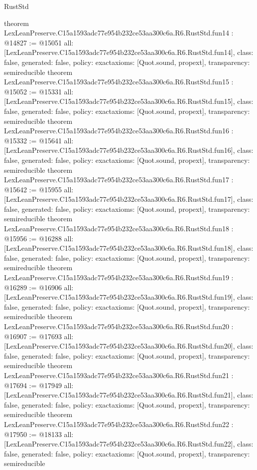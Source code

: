 \begin{lexlean}{RustStd}
\begin{coremodule}
{}
theorem LexLeanPreserve.C15a1593adc77e954b232ce53aa300c6a.R6.RustStd.fun14 : @14827 := @15051 {
  all: [LexLeanPreserve.C15a1593adc77e954b232ce53aa300c6a.R6.RustStd.fun14],
  class: false,
  generated: false,
  policy: exact{axioms: [Quot.sound, propext]},
  transparency: semireducible
}
theorem LexLeanPreserve.C15a1593adc77e954b232ce53aa300c6a.R6.RustStd.fun15 : @15052 := @15331 {
  all: [LexLeanPreserve.C15a1593adc77e954b232ce53aa300c6a.R6.RustStd.fun15],
  class: false,
  generated: false,
  policy: exact{axioms: [Quot.sound, propext]},
  transparency: semireducible
}
theorem LexLeanPreserve.C15a1593adc77e954b232ce53aa300c6a.R6.RustStd.fun16 : @15332 := @15641 {
  all: [LexLeanPreserve.C15a1593adc77e954b232ce53aa300c6a.R6.RustStd.fun16],
  class: false,
  generated: false,
  policy: exact{axioms: [Quot.sound, propext]},
  transparency: semireducible
}
theorem LexLeanPreserve.C15a1593adc77e954b232ce53aa300c6a.R6.RustStd.fun17 : @15642 := @15955 {
  all: [LexLeanPreserve.C15a1593adc77e954b232ce53aa300c6a.R6.RustStd.fun17],
  class: false,
  generated: false,
  policy: exact{axioms: [Quot.sound, propext]},
  transparency: semireducible
}
theorem LexLeanPreserve.C15a1593adc77e954b232ce53aa300c6a.R6.RustStd.fun18 : @15956 := @16288 {
  all: [LexLeanPreserve.C15a1593adc77e954b232ce53aa300c6a.R6.RustStd.fun18],
  class: false,
  generated: false,
  policy: exact{axioms: [Quot.sound, propext]},
  transparency: semireducible
}
theorem LexLeanPreserve.C15a1593adc77e954b232ce53aa300c6a.R6.RustStd.fun19 : @16289 := @16906 {
  all: [LexLeanPreserve.C15a1593adc77e954b232ce53aa300c6a.R6.RustStd.fun19],
  class: false,
  generated: false,
  policy: exact{axioms: [Quot.sound, propext]},
  transparency: semireducible
}
theorem LexLeanPreserve.C15a1593adc77e954b232ce53aa300c6a.R6.RustStd.fun20 : @16907 := @17693 {
  all: [LexLeanPreserve.C15a1593adc77e954b232ce53aa300c6a.R6.RustStd.fun20],
  class: false,
  generated: false,
  policy: exact{axioms: [Quot.sound, propext]},
  transparency: semireducible
}
theorem LexLeanPreserve.C15a1593adc77e954b232ce53aa300c6a.R6.RustStd.fun21 : @17694 := @17949 {
  all: [LexLeanPreserve.C15a1593adc77e954b232ce53aa300c6a.R6.RustStd.fun21],
  class: false,
  generated: false,
  policy: exact{axioms: [Quot.sound, propext]},
  transparency: semireducible
}
theorem LexLeanPreserve.C15a1593adc77e954b232ce53aa300c6a.R6.RustStd.fun22 : @17950 := @18133 {
  all: [LexLeanPreserve.C15a1593adc77e954b232ce53aa300c6a.R6.RustStd.fun22],
  class: false,
  generated: false,
  policy: exact{axioms: [Quot.sound, propext]},
  transparency: semireducible
}
\end{coremodule}
\end{lexlean}
